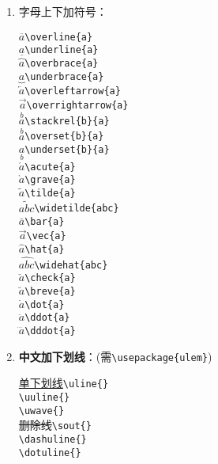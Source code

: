 \documentclass[fontset=windows]{article}
\newcommand{\q}{\quad}
\begin{document}
\begin{multicols}{2}
\begin{enumerate}
\item 字母上下加符号：
\vspace{-4mm}
\begin{multicols}{2}
$ \overline{a} $\q \verb|\overline{a}| \\
$ \underline{a} $\q \verb|\underline{a}| \\
$ \overbrace{a} $\q \verb|\overbrace{a}| \\
$ \underbrace{a} $\q \verb|\underbrace{a}| \\
$ \overleftarrow{a} $\q \verb|\overleftarrow{a}| \\
$ \overrightarrow{a} $\q \verb|\overrightarrow{a}| \\
$ \stackrel{b}{a} $\q \verb|\stackrel{b}{a}| \\
$ \overset{b}{a} $\q \verb|\overset{b}{a}| \\
$ \underset{b}{a} $\q \verb|\underset{b}{a}| \\
$ \acute{a} $\q \verb|\acute{a}| \\
$ \grave{a} $\q \verb|\grave{a}| \\
$ \tilde{a} $\q \verb|\tilde{a}| \\
$ \widetilde{abc} $\q \verb|\widetilde{abc}| \\
$ \bar{a} $\q \verb|\bar{a}| \\
$ \vec{a} $\q \verb|\vec{a}| \\
$ \hat{a} $\q \verb|\hat{a}| \\
$ \widehat{abc} $\q \verb|\widehat{abc}| \\
$ \check{a} $\q \verb|\check{a}| \\
$ \breve{a} $\q \verb|\breve{a}| \\
$ \dot{a} $\q \verb|\dot{a}| \\
$ \ddot{a} $\q \verb|\ddot{a}| \\
$ \dddot{a} $\q \verb|\dddot{a}| 
\end{multicols}
\vspace{-4mm}

\item \textbf{中文加下划线}：(需\verb|\usepackage{ulem}|)
\vspace{-5mm}
\begin{multicols}{2}
\uline{单下划线}\q \verb|\uline{}| \\
\q \verb|\uuline{}| \\
\q\q \verb|\uwave{}| \\
\sout{删除线}\q\q \verb|\sout{}| \\
\q \verb|\dashuline{}| \\
\q \verb|\dotuline{}| 
\end{multicols}


\end{enumerate}
\end{multicols}
\end{document}
